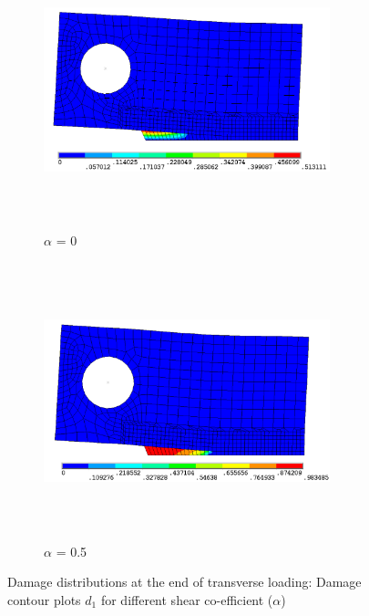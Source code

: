 \documentclass[12pt,a4paper,twoside,openright]{report}
\begin{document}
\begin{figure}[htbp!]
       \captionsetup[subfigure]{justification=centering}
     \begin{subfigure}{0.4\textwidth}
         \includegraphics[width=8.3cm,height=8cm,keepaspectratio]{26.d1_a_0.png}
         \caption{$\alpha$ = 0}
         \label{fig:d1-a_0}
     \end{subfigure}
    \hspace{2cm}
     \captionsetup[subfigure]{justification=centering}
     \begin{subfigure}{0.4\textwidth}
         \includegraphics[width=8.3cm,height=8cm,keepaspectratio]{26.d1_a_0.5.png}
         \caption{$\alpha$ = 0.5}
         \label{fig:d1-a_0.5}
     \end{subfigure}
             \caption{Damage distributions at the end of transverse loading: Damage contour plots $d_{1}$ for different shear co-efficient ($\alpha$)}
        \label{fig: Damage contour plots alpha d1} 
\end{figure}
\FloatBarrier
\end{document}
